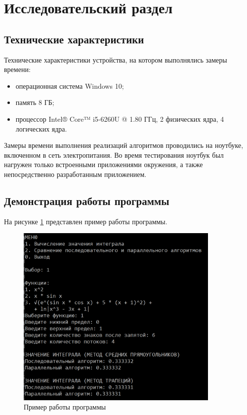 \section{Исследовательский раздел \hfill}
\vspace{\baselineskip}


\subsection{Технические характеристики}

Технические характеристики устройства, на котором выполнялись замеры времени:

\begin{itemize}[label=---]
	\item операционная система Windows 10;
	\item память 8 ГБ;
	\item процессор Intel® Core™ i5-6260U @ 1.80 ГГц, 2 физических ядра, 4 логических ядра.
\end{itemize}

Замеры времени выполнения реализаций алгоритмов проводились на ноутбуке, включенном в сеть электропитания. Во время тестирования ноутбук был нагружен только встроенными приложениями окружения, а также непосредственно разработанным приложением.

\subsection{Демонстрация работы программы}

На рисунке \ref{fig:example} представлен пример работы программы.
\clearpage

\begin{figure}[h!btp]
	\centering
	\includegraphics[width=280pt]{inc/example.png}
	\caption{Пример работы программы}
	\label{fig:example}	
\end{figure}

